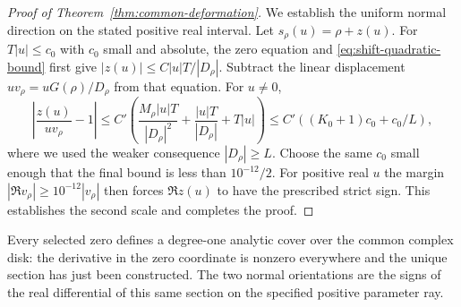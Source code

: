 \begin{proof}[Proof of Theorem~\ref{thm:common-deformation}]
We establish the uniform normal direction on the stated positive
real interval. Let $s_\rho(u)=\rho+z(u)$. For $T|u|\le c_0$ with
$c_0$ small and absolute, the zero equation and
\eqref{eq:shift-quadratic-bound} first give
$|z(u)|\le C|u|T/|D_\rho|$. Subtract the linear displacement
$uv_\rho=uG(\rho)/D_\rho$ from that equation. For $u\ne0$,
\[
 \left|\frac{z(u)}{uv_\rho}-1\right|
 \le C'\left(
       \frac{M_\rho|u|T}{|D_\rho|^2}
       +\frac{|u|T}{|D_\rho|}+T|u|\right)
 \le C'((K_0+1)c_0+c_0/L),
\]
where we used the weaker consequence $|D_\rho|\ge L$.
Choose the same $c_0$ small enough that the final bound is less than
$10^{-12}/2$. For positive real $u$ the margin
$|\Re v_\rho|\ge10^{-12}|v_\rho|$ then forces $\Re z(u)$ to have
the prescribed strict sign. This establishes the second scale and
completes the proof.
\end{proof}

Every selected zero defines a degree-one analytic cover over the
common complex disk: the derivative in the zero coordinate is
nonzero everywhere and the unique section has just been constructed.
The two normal orientations are the signs of the real differential
of this same section on the specified positive parameter ray.
